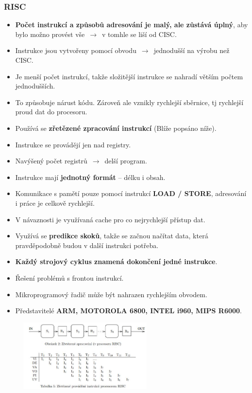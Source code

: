 \subsubsection{RISC}
\begin{itemize}
\item {\textbf{Počet instrukcí a způsobů adresování je malý, ale zůstává úplný}, aby bylo možno provést vše $\,\to\,$ v tomhle se liší od CISC}.
\item {Instrukce jsou vytvořeny pomocí obvodu $\,\to\,$ jednodušší na výrobu než CISC}.
\item Je menší počet instrukcí, takže složitější instrukce se nahradí větším počtem jednodušších.
\item To způsobuje nárust kódu. Zároveň ale vznikly rychlejší sběrnice, tj rychlejší proud dat do procesoru.
\item {Používá se \textbf{zřetězené zpracování instrukcí} (Blíže popsáno níže)}. 
\item {Instrukce se provádějí jen nad registry}.
\item {Navýšený počet registrů $\,\to\,$ delší program}.
\item {Instrukce mají \textbf{jednotný formát} -- délku i obsah}.
\item {Komunikace s pamětí pouze pomocí instrukcí \textbf{LOAD / STORE}, adresování i práce je celkově rychlejší}.
\item V návaznosti je využívaná cache pro co nejrychlejší přístup dat.
\item Využívá se \textbf{predikce skoků}, takže se začnou načítat data, která pravděpodobně budou v další instrukci potřeba.
\item {\textbf{Každý strojový cyklus znamená dokončení jedné instrukce}}.
\item {Řešení problémů s frontou instrukcí}.
\item {Mikroprogramový řadič může být nahrazen rychlejším obvodem}.
\item {Představitelé \textbf{ARM, MOTOROLA 6800, INTEL i960, MIPS R6000}}.
\end{itemize}
\begin{figure}[H]
\centering
\includegraphics[width=0.6\textwidth]{assets/1_risc_zretezeni}
\end{figure}

